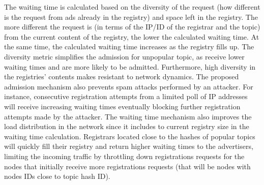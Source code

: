 The waiting time is calculated based on the diversity of the request (\ie how different is the request from ads already in the registry) and space left in the registry. 
The more different the request is (in terms of the IP/ID of the registrar and the topic) from the current content of the registry, the lower the calculated waiting time. 
At the same time, the calculated waiting time increases as the registry fills up. 
The diversity metric  simplifies the admission for unpopular topic, as receive lower waiting times and are more likely to be admitted.
Furthermore,  high diversity in the registries' contents makes \sysname resistant to network dynamics. The proposed admission mechanism also prevents spam attacks performed by an attacker. 
For instance, consecutive registration attempts from a limited poll of IP addresses will receive increasing waiting times eventually blocking further registration attempts made by the attacker. 
The waiting time mechanism also improves the load distribution in the network since it includes to current registry size in the waiting time calculation.
Registrars located close to the hashes of popular topics will quickly fill their registry and return higher waiting times to the advertisers, limiting the incoming traffic by throttling down registrations requests for the nodes that initially receive more registrations requests (that will be nodes with nodes IDs close to topic hash ID).






